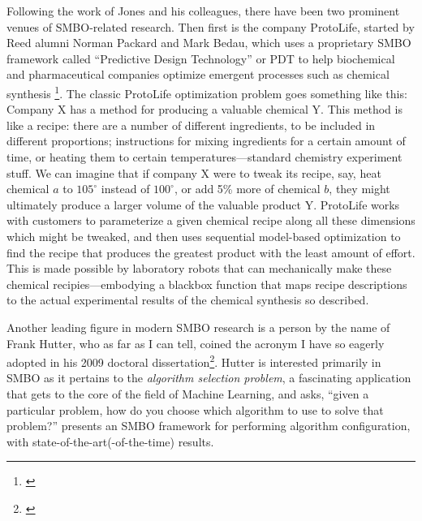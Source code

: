 Following the work of Jones and his colleagues, there have been two prominent venues of SMBO-related research. Then first is the company ProtoLife, started by Reed alumni Norman Packard and Mark Bedau, which uses a proprietary SMBO framework called ``Predictive Design Technology'' or PDT to help biochemical and pharmaceutical companies optimize emergent processes such as chemical synthesis \footnote{\cite{protolife_pdt_2013}}. The classic ProtoLife optimization problem goes something like this: Company X has a method for producing a valuable chemical Y. This method is like a recipe: there are a number of different ingredients, to be included in different proportions; instructions for mixing ingredients for a certain amount of time, or heating them to certain temperatures---standard chemistry experiment stuff. We can imagine that if company X were to tweak its recipe, say, heat chemical $a$ to $105^{\circ}$ instead of $100^{\circ}$, or add 5\% more of chemical $b$, they might ultimately produce a larger volume of the valuable product Y. ProtoLife works with customers to parameterize a given chemical recipe along all these dimensions which might be tweaked, and then uses sequential model-based optimization to find the recipe that produces the greatest product with the least amount of effort. This is made possible by laboratory robots that can mechanically make these chemical recipies---embodying a blackbox function that maps recipe descriptions to the actual experimental results of the chemical synthesis so described. 

Another leading figure in modern SMBO research is a person by the name of Frank Hutter, who as far as I can tell, coined the acronym I have so eagerly adopted in his 2009 doctoral dissertation\footnote{\cite{hutter_automated_2009}}. Hutter is interested primarily in SMBO as it pertains to the \emph{algorithm selection problem}, a fascinating application that gets to the core of the field of Machine Learning, and asks, ``given a particular problem, how do you choose which algorithm to use to solve that problem?'' \cite{hutter_sequential_2011} presents an SMBO framework for performing algorithm configuration, with state-of-the-art(-of-the-time) results.




